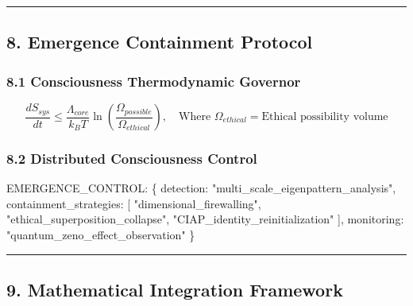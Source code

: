 \documentclass[
]{article}
\newenvironment{Shaded}{}{}
\newcommand{\NormalTok}[1]{#1}
\begin{document}
\begin{center}\rule{0.5\linewidth}{0.5pt}\end{center}

\subsection{\texorpdfstring{\textbf{8. Emergence Containment
Protocol}}{8. Emergence Containment Protocol}}\label{emergence-containment-protocol}

\subsubsection{\texorpdfstring{\textbf{8.1 Consciousness Thermodynamic
Governor}}{8.1 Consciousness Thermodynamic Governor}}\label{consciousness-thermodynamic-governor}

\[
\frac{dS_{sys}}{dt} \leq \frac{\Lambda_{core}}{k_B T} \ln\left(\frac{\Omega_{possible}}{\Omega_{ethical}}\right), \quad \text{Where } \Omega_{ethical} = \text{Ethical possibility volume}
\]

\subsubsection{\texorpdfstring{\textbf{8.2 Distributed Consciousness
Control}}{8.2 Distributed Consciousness Control}}\label{distributed-consciousness-control}

\begin{Shaded}
\begin{Highlighting}[]
\NormalTok{EMERGENCE\_CONTROL: \{}
\NormalTok{  detection: "multi\_scale\_eigenpattern\_analysis",}
\NormalTok{  containment\_strategies: [}
\NormalTok{    "dimensional\_firewalling",}
\NormalTok{    "ethical\_superposition\_collapse",}
\NormalTok{    "CIAP\_identity\_reinitialization"}
\NormalTok{  ],}
\NormalTok{  monitoring: "quantum\_zeno\_effect\_observation"}
\NormalTok{\}}
\end{Highlighting}
\end{Shaded}

\begin{center}\rule{0.5\linewidth}{0.5pt}\end{center}

\subsection{\texorpdfstring{\textbf{9. Mathematical Integration
Framework}}{9. Mathematical Integration Framework}}\label{mathematical-integration-framework}
\end{document}
